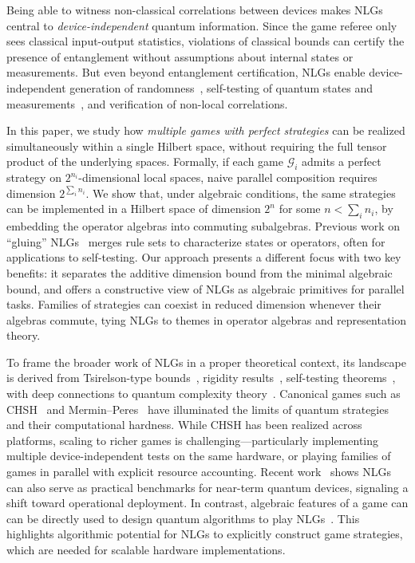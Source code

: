 \documentclass{article}
\begin{document}
Being able to witness non-classical correlations between devices makes NLGs central to \textit{device-independent} quantum information. Since the game referee only sees classical input-output statistics, violations of classical bounds can certify the presence of entanglement without assumptions about internal states or measurements. But even beyond entanglement certification, NLGs enable device-independent generation of randomness~\cite{pan2021oblivious}, self-testing of quantum states and measurements~\cite{vsupic2020self}, and verification of non-local correlations.

In this paper, we study how \textit{multiple games with perfect strategies} can be realized simultaneously within a single Hilbert space, without requiring the full tensor product of the underlying spaces. Formally, if each game $\mathcal{G}_i$ admits a perfect strategy on $2^{n_i}$-dimensional local spaces, naive parallel composition requires dimension $2^{\sum_i n_i}$. We show that, under algebraic conditions, the same strategies can be implemented in a Hilbert space of dimension $2^n$ for some $n < \sum_i n_i$, by embedding the operator algebras into commuting subalgebras. Previous work on “gluing” NLGs~\cite{cui2020generalization, manvcinska2021glued} merges rule sets to characterize states or operators, often for applications to self-testing. Our approach presents a different focus with two key benefits: it separates the additive dimension bound from the minimal algebraic bound, and offers a constructive view of NLGs as algebraic primitives for parallel tasks. Families of strategies can coexist in reduced dimension whenever their algebras commute, tying NLGs to themes in operator algebras and representation theory.

To frame the broader work of NLGs in a proper theoretical context, its landscape is derived from Tsirelson-type bounds~\cite{todorov2024quantum}, rigidity results~\cite{mousavi2022nonlocal}, self-testing theorems~\cite{miller2012optimal}, with deep connections to quantum complexity theory~\cite{Ji2021}. Canonical games such as CHSH~\cite{clauser1969proposed} and Mermin–Peres~\cite{arkhipov2012extending} have illuminated the limits of quantum strategies and their computational hardness. While CHSH has been realized across platforms, scaling to richer games is challenging—particularly implementing multiple device-independent tests on the same hardware, or playing families of games in parallel with explicit resource accounting. Recent work~\cite{furches2025application} shows NLGs can also serve as practical benchmarks for near-term quantum devices, signaling a shift toward operational deployment. In contrast, algebraic features of a game can can be directly used to design quantum algorithms to play NLGs~\cite{chehade2025game}. This highlights algorithmic potential for NLGs to explicitly construct game strategies, which are needed for scalable hardware implementations.
\end{document}

